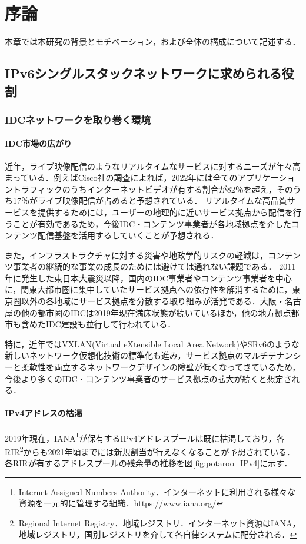 \chapter{序論}
\label{introduction}
本章では本研究の背景とモチベーション，および全体の構成について記述する．

\section{IPv6シングルスタックネットワークに求められる役割}
\label{introduction:background}

\subsection{IDCネットワークを取り巻く環境}
\subsubsection{IDC市場の広がり}


近年，ライブ映像配信のようなリアルタイムなサービスに対するニーズが年々高まっている．例えばCisco社の調査\cite{index2017global}によれば，2022年には全てのアプリケーショントラフィックのうちインターネットビデオが有する割合が82％を超え，そのうち17％がライブ映像配信が占めると予想されている．
リアルタイムな高品質サービスを提供するためには，ユーザーの地理的に近いサービス拠点から配信を行うことが有効であるため，今後IDC・コンテンツ事業者が各地域拠点を介したコンテンツ配信基盤を活用するしていくことが予想される．

また，インフラストラクチャに対する災害や地政学的リスクの軽減は，コンテンツ事業者の継続的な事業の成長のためには避けては通れない課題である\cite{alonso2001business}．
2011年に発生した東日本大震災以降，国内のIDC事業者やコンテンツ事業者を中心に，関東大都市圏に集中していたサービス拠点への依存性を解消するために，東京圏以外の各地域にサービス拠点を分散する取り組みが活発である\cite{JANOG44_robust}．大阪・名古屋の他の都市圏のIDCは2019年現在満床状態が続いているほか，他の地方拠点都市も含めたIDC建設も並行して行われている．　

特に，近年ではVXLAN(Virtual eXtensible Local Area Network)\cite{RFC7348}やSRv6\cite{RFC8402}のような新しいネットワーク仮想化技術の標準化も進み，サービス拠点のマルチテナンシーと柔軟性を両立するネットワークデザインの障壁が低くなってきているため，今後より多くのIDC・コンテンツ事業者のサービス拠点の拡大が続くと想定される．


\subsubsection{IPv4アドレスの枯渇}
\label{introduction:background:ipv4_problems}
2019年現在，IANA\footnote{Internet Assigned Numbers Authority．インターネットに利用される様々な資源を一元的に管理する組織．\url{https://www.iana.org/}}が保有するIPv4アドレスプールは既に枯渇しており\cite{IANA_allocation}，各RIR\footnote{Regional Internet Registry．地域レジストリ．インターネット資源はIANA，地域レジストリ，国別レジストリを介して各自律システムに配分される．}からも2021年頃までには新規割当が行えなくなることが予想されている\cite{potaroo_IPv4}．各RIRが有するアドレスプールの残余量の推移を図\ref{fig:potaroo_IPv4}に示す．

